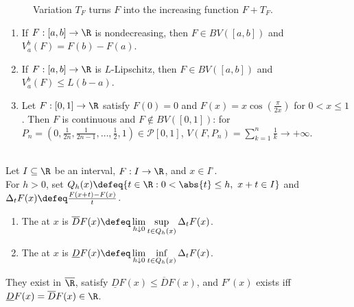 \begin{figure}[H]
  \centering
  
  \caption{Variation \textcolor{orange!80!black}{$T_F$} turns \textcolor{blue!70!black}{$F$} into the increasing function \textcolor{green!45!black}{$F+T_F$}.}
  \label{fig:bounded-variation-jordan-decomposition}
\end{figure}

\begin{example} \label{ex:bounded-variation-basic-examples} 
\begin{enumerate}[label=(\roman*)]
\setlength{\itemsep}{0pt}
\item If $F:[a,b]\to\R$ is nondecreasing, then $F\in BV([a,b])$ and $V_a^b(F)=F(b)-F(a)$.
\item If $F:[a,b]\to\R$ is $L$-Lipschitz, then $F\in BV([a,b])$ and $V_a^b(F)\leq L(b-a)$.
\item Let $F:[0,1]\to\R$ satisfy $F(0)=0$ and $F(x)=x\cos(\frac{\pi}{2x})$ for $0<x\leq1$. Then $F$ is continuous and $F\notin BV([0,1])$: for $P_n=(0,\frac{1}{2n},\frac{1}{2n-1},\ldots,\frac{1}{2},1)\in\mathcal{P}[0,1]$, $V(F,P_n)=\sum\limits_{k=1}^n\frac{1}{k}\to+\infty$.
\end{enumerate}
\end{example}

\begin{definition} \label{def:upper-lower-derivatives} \\
Let $I\subseteq\R$ be an interval, $F:I\to\R$, and $x\in I^\circ$.\\
For $h>0$, set $Q_h(x)\defeq\{t\in\R:0<\abs{t}\leq h,\ x+t\in I\}$ and $\Delta_tF(x)\defeq\frac{F(x+t)-F(x)}{t}$.
\begin{enumerate}[label=(\roman*)]
\setlength{\itemsep}{0pt}
\item The  at $x$ is $\overline{D}F(x)\defeq\lim\limits_{h\downarrow0}\sup\limits_{t\in Q_h(x)}\Delta_tF(x)$.
\item The  at $x$ is $\underline{D}F(x)\defeq\lim\limits_{h\downarrow0}\inf\limits_{t\in Q_h(x)}\Delta_tF(x)$.
\end{enumerate}
They exist in $\overline{\R}$, satisfy $\underline{D}F(x)\leq\overline{D}F(x)$, and $F'(x)$ exists iff $\underline{D}F(x)=\overline{D}F(x)\in\R$.
\end{definition}


